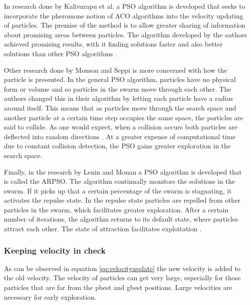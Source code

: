 In research done by Kalivarapu et al. \cite{PSOPheromones} a \gls{PSO} algorithm is developed that seeks to incorporate the pheromone notion of \gls{ACO} algorithms into the velocity updating of particles. The premise of the method is to allow greater sharing of information about promising areas between particles. The algorithm developed by the authors achieved promising results, with it finding solutions faster and also better solutions than other \gls{PSO} algorithms \cite{PSOPheromones}. 

Other research done by Monson and Seppi \cite{adaptPSO} is more concerned with how the particle is presented. In the general \gls{PSO} algorithm, particles have no physical form or volume and so particles in the swarm move through each other. The authors changed this in their algorithm by letting each particle have a radius around itself. This means that as particles move through the search space and another particle at a certain time step occupies the same space, the particles are said to collide. As one would expect, when a collision occurs both particles are deflected into random directions \cite{adaptPSO}. At a greater expense of computational time due to constant collision detection, the \gls{PSO} gains greater exploration in the search space. 

Finally, in the research by Lenin and Monan a \gls{PSO} algorithm is developed that is called the \gls{ARPSO}. The algorithm continually monitors the solutions in the swarm. If it picks up that a certain percentage of the swarm is stagnating, it activates the repulse state. In the repulse state particles are repelled from other particles in the swarm, which facilitates greater exploration. After a certain number of iterations, the algorithm returns to its default state, where particles attract each other. The state of attraction facilitates exploitation \cite{PSOAttractRepulse}.
\subsubsection{Keeping velocity in check}
As can be observed in equation \ref{eq:velocityupdate} the new velocity is added to the old velocity. The velocity of particles can get very large, especially for those particles that are far from the pbest and gbest positions. Large velocities are necessary for early exploration. 

